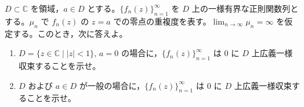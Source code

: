\documentclass[12pt]{jlreq}
\begin{document}
$D \subset \mathbb{C}$ を領域，$a \in D$ とする。$\{f_n(z)\}_{n=1}^\infty$ を $D$ 上の一様有界な正則関数列とする。$\mu_n$ で $f_n(z)$ の $z = a$ での零点の重複度を表す。$\lim_{n\to\infty} \mu_n = \infty$ を仮定する。このとき，次に答えよ。

\begin{enumerate}
  \item $D = \{ z \in \mathbb{C} \mid |z| < 1 \}$, $a = 0$ の場合に，$\{f_n(z)\}_{n=1}^\infty$ は $0$ に $D$ 上広義一様収束することを示せ。
  \item $D$ および $a \in D$ が一般の場合に，$\{f_n(z)\}_{n=1}^\infty$ は $0$ に $D$ 上広義一様収束することを示せ。
\end{enumerate}
\end{document}
